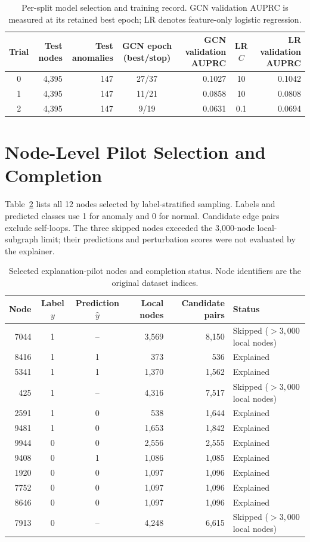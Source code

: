 \documentclass[11pt,a4paper]{article}
\begin{document}
\begin{table}[ht]
\centering
\small
\caption{Per-split model selection and training record. GCN validation AUPRC is measured at its retained best epoch; LR denotes feature-only logistic regression.}
\label{tab:selection}
\begin{tabular}{c r r c r c r}
\toprule
Trial & Test nodes & Test anomalies & GCN epoch (best/stop) & GCN validation AUPRC & LR $C$ & LR validation AUPRC\\
\midrule
0 & 4,395 & 147 & 27/37 & 0.1027 & 10 & 0.1042\\
1 & 4,395 & 147 & 11/21 & 0.0858 & 10 & 0.0808\\
2 & 4,395 & 147 & 9/19 & 0.0631 & 0.1 & 0.0694\\
\bottomrule
\end{tabular}
\end{table}

\section{Node-Level Pilot Selection and Completion}
Table~\ref{tab:pilotselection} lists all 12 nodes selected by label-stratified sampling. Labels and predicted classes use 1 for anomaly and 0 for normal. Candidate edge pairs exclude self-loops. The three skipped nodes exceeded the 3,000-node local-subgraph limit; their predictions and perturbation scores were not evaluated by the explainer.

\begin{table}[ht]
\centering
\small
\caption{Selected explanation-pilot nodes and completion status. Node identifiers are the original dataset indices.}
\label{tab:pilotselection}
\begin{tabular}{r c c r r l}
\toprule
Node & Label $y$ & Prediction $\hat y$ & Local nodes & Candidate pairs & Status\\
\midrule
7044 & 1 & -- & 3,569 & 8,150 & Skipped ($>3,000$ local nodes)\\
8416 & 1 & 1 & 373 & 536 & Explained\\
5341 & 1 & 1 & 1,370 & 1,562 & Explained\\
425 & 1 & -- & 4,316 & 7,517 & Skipped ($>3,000$ local nodes)\\
2591 & 1 & 0 & 538 & 1,644 & Explained\\
9481 & 1 & 0 & 1,653 & 1,842 & Explained\\
9944 & 0 & 0 & 2,556 & 2,555 & Explained\\
9408 & 0 & 1 & 1,086 & 1,085 & Explained\\
1920 & 0 & 0 & 1,097 & 1,096 & Explained\\
7752 & 0 & 0 & 1,097 & 1,096 & Explained\\
8646 & 0 & 0 & 1,097 & 1,096 & Explained\\
7913 & 0 & -- & 4,248 & 6,615 & Skipped ($>3,000$ local nodes)\\
\bottomrule
\end{tabular}
\end{table}
\end{document}
